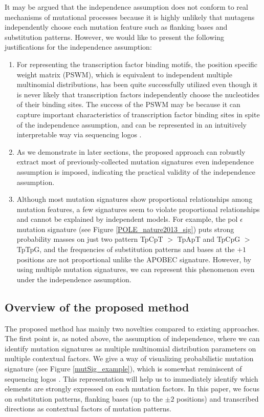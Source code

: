 It may be argued that the independence assumption does not conform to real mechanisms of mutational processes 
because it is highly unlikely that mutagens independently choose each mutation feature such as flanking bases and substitution patterns. 
However, we would like to present the following justifications for the independence assumption: 

\begin{enumerate}
\item
For representing the transcription factor binding motifs, the position specific weight matrix (PSWM), 
which is equivalent to independent multiple multinomial distributions, 
has been quite successfully utilized 
even though it is never likely that transcription factors independently choose the nucleotides of their binding sites. 
The success of the PSWM may be because it can capture important characteristics of transcription factor binding sites 
in spite of the independence assumption,
and can be represented in an intuitively interpretable way via sequencing logos \cite{pmid2172928}.

\item
As we demonstrate in later sections, 
the proposed approach can robustly extract most of previously-collected mutation signatures even independence assumption is imposed,
indicating the practical validity of the independence assumption.

\item
Although most mutation signatures show proportional relationships among mutation features, 
a few signatures seem to violate proportional relationships and cannot be explained by independent models. 
For example, the pol $\epsilon$ mutation signature \cite{pmid23945592} (see Figure \ref{POLE_nature2013_sig}) puts strong probability masses 
on just two pattern TpCpT $>$ TpApT and TpCpG $>$ TpTpG, 
and the frequencies of substitution patterns and bases at the $+1$ positions are not proportional unlike the APOBEC signature.
However, by using multiple mutation signatures, we can represent this phenomenon even under the independence assumption.
\end{enumerate}


\subsection*{Overview of the proposed method}

The proposed method has mainly two novelties compared to existing approaches.
The first point is, as noted above, the assumption of independence, where we can identify mutation signatures as multiple multinomial distribution parameters on multiple contextual factors.
We give a way of visualizing probabilistic mutation signature (see Figure \ref{mutSig_example}), 
which is somewhat reminiscent of sequencing logos \cite{pmid2172928}. 
This representation will help us to immediately identify which elements are strongly expressed on each mutation factors.
In this paper, we focus on substitution patterns, flanking bases (up to the $\pm 2$ positions) and transcribed directions as contextual factors of mutation patterns.



